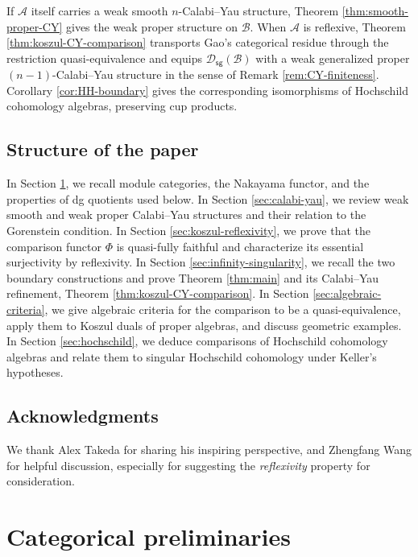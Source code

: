 \documentclass[11pt,letterpaper,reqno]{amsart}
\theoremstyle{plain}
\theoremstyle{definition}
\theoremstyle{plain}
\theoremstyle{definition}
\numberwithin{equation}{section}
\begin{document}
If $\mathscr A$ itself carries a weak smooth $n$-Calabi--Yau structure, Theorem \ref{thm:smooth-proper-CY} gives the weak proper structure on $\mathscr B$.
When $\mathscr A$ is reflexive, Theorem \ref{thm:koszul-CY-comparison} transports Gao's categorical residue through the restriction quasi-equivalence and equips $\mathscr D_{\mathsf{sg}}(\mathscr B)$ with a weak generalized proper $(n-1)$-Calabi--Yau structure in the sense of Remark \ref{rem:CY-finiteness}.
Corollary \ref{cor:HH-boundary} gives the corresponding isomorphisms of Hochschild cohomology algebras, preserving cup products.

\subsection*{Structure of the paper}

In Section \ref{sec:basic}, we recall module categories, the Nakayama functor, and the properties of dg quotients used below.
In Section \ref{sec:calabi-yau}, we review weak smooth and weak proper Calabi--Yau structures and their relation to the Gorenstein condition.
In Section \ref{sec:koszul-reflexivity}, we prove that the comparison functor $\Phi$ is quasi-fully faithful and characterize its essential surjectivity by reflexivity.
In Section \ref{sec:infinity-singularity}, we recall the two boundary constructions and prove Theorem \ref{thm:main} and its Calabi--Yau refinement, Theorem \ref{thm:koszul-CY-comparison}.
In Section \ref{sec:algebraic-criteria}, we give algebraic criteria for the comparison to be a quasi-equivalence, apply them to Koszul duals of proper algebras, and discuss geometric examples.
In Section \ref{sec:hochschild}, we deduce comparisons of Hochschild cohomology algebras and relate them to singular Hochschild cohomology under Keller's hypotheses.

\subsection*{Acknowledgments}

We thank Alex Takeda for sharing his inspiring perspective, and Zhengfang Wang for helpful discussion, especially for suggesting the \textit{reflexivity} property for consideration.

\section{Categorical preliminaries}\label{sec:basic}
\end{document}
